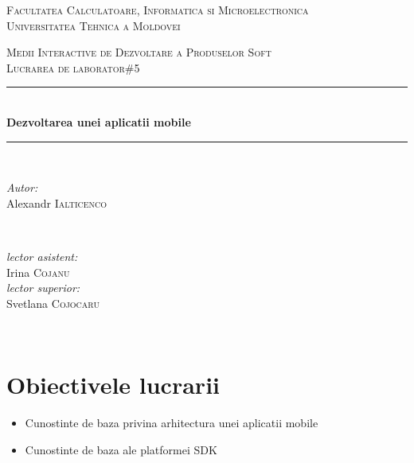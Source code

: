 \documentclass[12pt]{article}
\begin{document}
\begin{titlepage}
\begin{center} 
 \textsc{\large Facultatea Calculatoare, Informatica si Microelectronica}\\[0.5cm]
\textsc{\large Universitatea Tehnica a Moldovei}\\[1.2cm] 
\vspace{25 mm}

\textsc{\Large Medii Interactive de Dezvoltare a Produselor Soft}\\[0.5cm] 
\textsc{\large Lucrarea de laborator\#5}\\[0.5cm] \newcommand{\HRule}{\rule{\linewidth}{0.5mm}} 
  \vspace{10 mm}
  \HRule \\[0.4cm]
  { \LARGE \bfseries Dezvoltarea unei aplicatii mobile  }\\[0.4cm] 
  \HRule \\[1.5cm]
      \vspace{30mm}

      \begin{minipage}{0.4\textwidth}
      \begin{flushleft} \large
      \emph{Autor:}\\
      Alexandr \textsc{Ialticenco}
      \end{flushleft}
      \end{minipage}
      ~
      \begin{minipage}{0.4\textwidth}
      \begin{flushright} \large
      \emph{lector asistent:} \\
      Irina \textsc{Cojanu} \\ 
      \emph{lector superior:} \\
      Svetlana \textsc{Cojocaru} 
      \end{flushright}
      \end{minipage}\\[4cm]

      \vspace{5 mm}

      \vfill
      \end{center}
      
\end{titlepage}

\section*{Obiectivele lucrarii}
\begin{itemize}
\item Cunostinte de baza privina arhitectura unei aplicatii mobile
\item Cunostinte de baza ale platformei SDK
\end{itemize}
\end{document}

